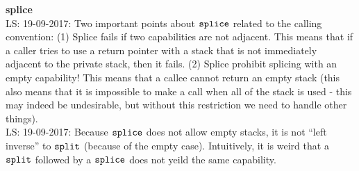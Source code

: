 \documentclass[a4paper]{article}
\newcommand\lau[1]{{\color{purple} \sf \footnotesize {LS: #1}}\\}
\newcommand{\targetcolor}[1]{\color{black}}
\newcommand{\trg}[1]{{\targetcolor{} #1}}
\newcommand{\zinstr}[1]{\texttt{#1}}
\newcommand{\threeinstr}[4]{
  \ifthenelse{\equal{#2#3#4}{}}
  {\zinstr{#1}}
  {\zinstr{#1} \; #2 \; #3 \; #4}
}
\newcommand{\fourinstr}[5]{
  \ifthenelse{\equal{#2#3#4#5}{}}
  {\zinstr{#1}}
  {\zinstr{#1} \; #2 \; #3 \; #4 \; #5}
}
\newcommand{\tsplice}[3]{\threeinstr{\trg{splice}}{#1}{#2}{#3}}
\newcommand{\tsplit}[4]{\fourinstr{\trg{split}}{#1}{#2}{#3}{#4}}
\begin{document}
\noindent\textbf{splice}\\
\lau{19-09-2017: Two important points about $\tsplice{}{}{}$ related to the calling convention: (1) Splice fails if two capabilities are not adjacent. This means that if a caller tries to use a return pointer with a stack that is not immediately adjacent to the private stack, then it fails. (2) Splice prohibit splicing with an empty capability! This means that a callee cannot return an empty stack (this also means that it is impossible to make a call when all of the stack is used - this may indeed be undesirable, but without this restriction we need to handle other things).}
\lau{19-09-2017: Because $\tsplice{}{}{}$ does not allow empty stacks, it is not ``left inverse'' to $\tsplit{}{}{}{}$ (because of the empty case). Intuitively, it is weird that a $\tsplit{}{}{}{}$ followed by a $\tsplice{}{}{}$ does not yeild the same capability.}
\end{document}
